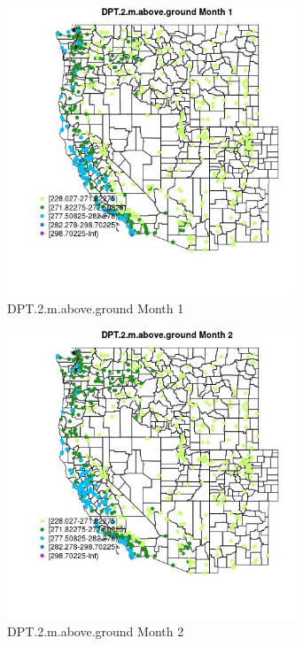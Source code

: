 \begin{figure} 
\centering  
\includegraphics[width=0.77\textwidth]{Code_Outputs/Report_ML_input_PM25_Step4_part_f_de_duplicated_aveswNAs_MapObsMo1DPT2maboveground.jpg} 
\caption{\label{fig:Report_ML_input_PM25_Step4_part_f_de_duplicated_aveswNAsMapObsMo1DPT2maboveground}DPT.2.m.above.ground Month 1} 
\end{figure} 
 

\begin{figure} 
\centering  
\includegraphics[width=0.77\textwidth]{Code_Outputs/Report_ML_input_PM25_Step4_part_f_de_duplicated_aveswNAs_MapObsMo2DPT2maboveground.jpg} 
\caption{\label{fig:Report_ML_input_PM25_Step4_part_f_de_duplicated_aveswNAsMapObsMo2DPT2maboveground}DPT.2.m.above.ground Month 2} 
\end{figure} 
 

